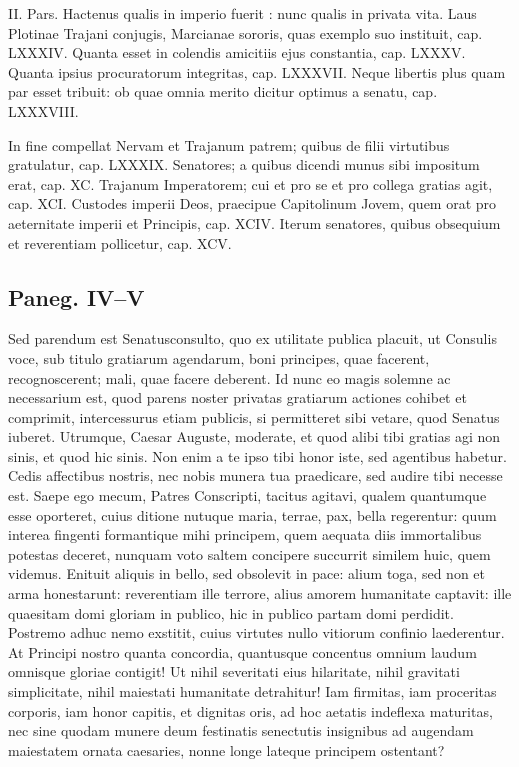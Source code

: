 {II. Pars. Hactenus qualis in imperio fuerit : nunc qualis in privata vita. Laus Plotinae Trajani conjugis, Marcianae sororis, quas exemplo suo instituit, cap. LXXXIV. Quanta esset in colendis amicitiis ejus constantia, cap. LXXXV. Quanta ipsius procuratorum integritas, cap. LXXXVII. Neque libertis plus quam par esset tribuit: ob quae omnia merito dicitur optimus a senatu, cap. LXXXVIII.

In fine compellat Nervam et Trajanum patrem; quibus de filii virtutibus gratulatur, cap. LXXXIX. Senatores; a quibus dicendi munus sibi impositum erat, cap. XC. Trajanum Imperatorem; cui et pro se et pro collega gratias agit, cap. XCI. Custodes imperii Deos, praecipue Capitolinum Jovem, quem orat pro aeternitate imperii et Principis, cap. XCIV. Iterum senatores, quibus obsequium et reverentiam pollicetur, cap. XCV. 
}



\subsection*{Paneg. IV–V}



Sed parendum est Senatusconsulto, quo ex utilitate publica placuit, ut Consulis voce, sub titulo gratiarum agendarum, boni principes, quae facerent, recognoscerent; mali, quae facere deberent. Id nunc eo magis solemne ac necessarium est, quod parens noster privatas gratiarum actiones cohibet et comprimit, intercessurus etiam publicis, si permitteret sibi vetare, quod Senatus iuberet. Utrumque, Caesar Auguste, moderate, et quod alibi tibi gratias agi non sinis, et quod hic sinis. Non enim a te ipso tibi honor iste, sed agentibus habetur. Cedis affectibus nostris, nec nobis munera tua praedicare, sed audire tibi necesse est. Saepe ego mecum, Patres Conscripti, tacitus agitavi, qualem quantumque esse oporteret, cuius ditione nutuque maria, terrae, pax, bella regerentur: quum interea fingenti formantique mihi principem, quem aequata diis immortalibus potestas deceret, nunquam voto saltem concipere succurrit similem huic, quem videmus. Enituit aliquis in bello, sed obsolevit in pace: alium toga, sed non et arma honestarunt: reverentiam ille terrore, alius amorem humanitate captavit: ille quaesitam domi gloriam in publico, hic in publico partam domi perdidit. Postremo adhuc nemo exstitit, cuius virtutes nullo vitiorum confinio laederentur. At Principi nostro quanta concordia, quantusque concentus omnium laudum omnisque gloriae contigit! Ut nihil severitati eius hilaritate, nihil gravitati simplicitate, nihil maiestati humanitate detrahitur! Iam firmitas, iam proceritas corporis, iam honor capitis, et dignitas oris, ad hoc aetatis indeflexa maturitas, nec sine quodam munere deum festinatis senectutis insignibus ad augendam maiestatem ornata caesaries, nonne longe lateque principem ostentant?

